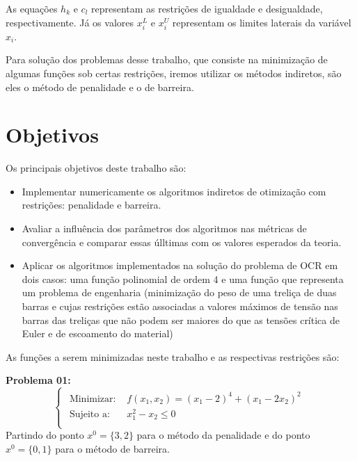 \documentclass[10pt, a4paper]{article}
\begin{document}
As equa\c c\~oes $h_k$ e $c_l$ representam as restri\c c\~oes de igualdade e desigualdade, respectivamente. J\'a os valores $x_i^L$ e $x_i^U$ representam os limites laterais da vari\'avel $x_i$.

Para solu\c c\~ao dos problemas desse trabalho, que consiste na minimiza\c c\~ao de algumas fun\c c\~oes sob certas restri\c c\~oes, iremos utilizar os m\'etodos indiretos, s\~ao eles o m\'etodo de penalidade e o de barreira.

\section{Objetivos}

Os principais objetivos deste trabalho s\~ao:
\begin{itemize}
      \item Implementar numericamente os algoritmos indiretos de otimiza\c c\~ao com restri\c c\~oes: penalidade e barreira.
      \item Avaliar a influ\^encia dos par\^ametros dos algoritmos nas m\'etricas de converg\^encia e comparar essas \'ulltimas com os valores esperados da teoria.
      \item Aplicar os algoritmos implementados na solu\c c\~ao do problema de OCR em dois casos: uma fun\c c\~ao polinomial de ordem 4 e uma fun\c c\~ao que representa um problema de engenharia (minimiza\c c\~ao do peso de uma treli\c ca de duas barras e cujas restri\c c\~oes est\~ao associadas a valores m\'aximos de tens\~ao nas barras das treli\c cas que n\~ao podem ser maiores do que as tens\~oes cr\'itica de Euler e de escoamento do material)
\end{itemize}

As fun\c c\~oes a serem minimizadas neste trabalho e as respectivas restri\c c\~oes s\~ao:

\textbf{Problema 01:}
\[
      \begin{cases}
            \begin{aligned}
            \text{Minimizar:  }   & f(x_1, x_2) = (x_1-2)^4 + (x_1-2x_2)^2 \\
            \text{Sujeito a:  }   & x_1^2 - x_2 \leq 0\\
            \end{aligned}
      \end{cases}
\]
Partindo do ponto $x^0=\{3,2\}$ para o m\'etodo da penalidade e do ponto $x^0=\{0,1\}$ para o m\'etodo de barreira.
\end{document}
